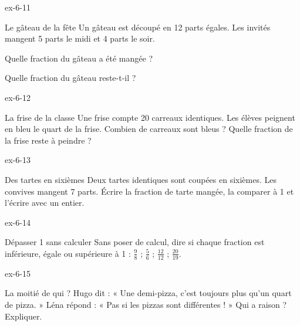 \begin{blocLivre}{ex-6-11}\begin{exercice}[3]{Le gâteau de la fête}
Un gâteau est découpé en 12 parts égales. Les invités mangent 5 parts le midi et 4 parts le soir.\begin{questions}
\item Quelle fraction du gâteau a été mangée ?
\item Quelle fraction du gâteau reste-t-il ?
\end{questions}
\label{fig-ex-6-11}
\end{exercice}\end{blocLivre}
\begin{blocLivre}{ex-6-12}\begin{exercice}[3]{La frise de la classe}
Une frise compte 20 carreaux identiques. Les élèves peignent en bleu le quart de la frise. Combien de carreaux sont bleus ? Quelle fraction de la frise reste à peindre ?
\label{fig-ex-6-12}
\end{exercice}\end{blocLivre}
\begin{blocLivre}{ex-6-13}\begin{exercice}[3]{Des tartes en sixièmes}
Deux tartes identiques sont coupées en sixièmes. Les convives mangent 7 parts. Écrire la fraction de tarte mangée, la comparer à 1 et l’écrire avec un entier.
\end{exercice}\end{blocLivre}
\begin{blocLivre}{ex-6-14}\begin{exercice}[3]{Dépasser 1 sans calculer}
Sans poser de calcul, dire si chaque fraction est inférieure, égale ou supérieure à 1 : $\frac98$ ; $\frac56$ ; $\frac{12}{12}$ ; $\frac{20}{19}$.
\end{exercice}\end{blocLivre}
\begin{blocLivre}{ex-6-15}\begin{exercice}[3]{La moitié de qui ?}
Hugo dit : « Une demi-pizza, c’est toujours plus qu’un quart de pizza. » Léna répond : « Pas si les pizzas sont différentes ! » Qui a raison ? Expliquer.
\end{exercice}\end{blocLivre}

\clearpage

